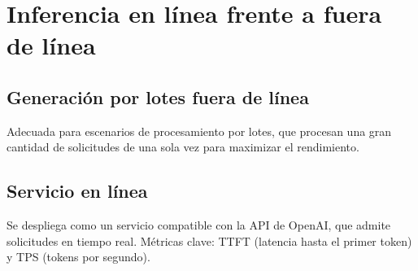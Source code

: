 \section{Inferencia en línea frente a fuera de línea}
\subsection{Generación por lotes fuera de línea}
Adecuada para escenarios de procesamiento por lotes, que procesan una gran cantidad de solicitudes de una sola vez para maximizar el rendimiento.

\subsection{Servicio en línea}
Se despliega como un servicio compatible con la API de OpenAI, que admite solicitudes en tiempo real. Métricas clave: TTFT (latencia hasta el primer token) y TPS (tokens por segundo).

